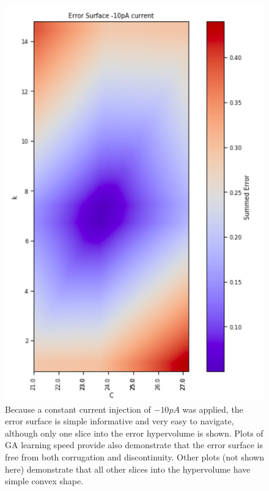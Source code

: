 \begin{figure}
    \centering
    \includegraphics[scale=0.7]{figures/friendly_error_surface.png}
    \caption[Using only constant currents causes simple tractable error surfaces]{Because a constant current injection of $-10pA$ was applied, the error surface is simple informative and very easy to navigate, although only one slice into the error hypervolume is shown. Plots of GA learning speed provide also demonstrate that the error surface is free from both corrugation and discontinuity. Other plots (not shown here) demonstrate that all other slices into the hypervolume have simple convex shape.}
    \label{fig:constant_current}
\end{figure}


